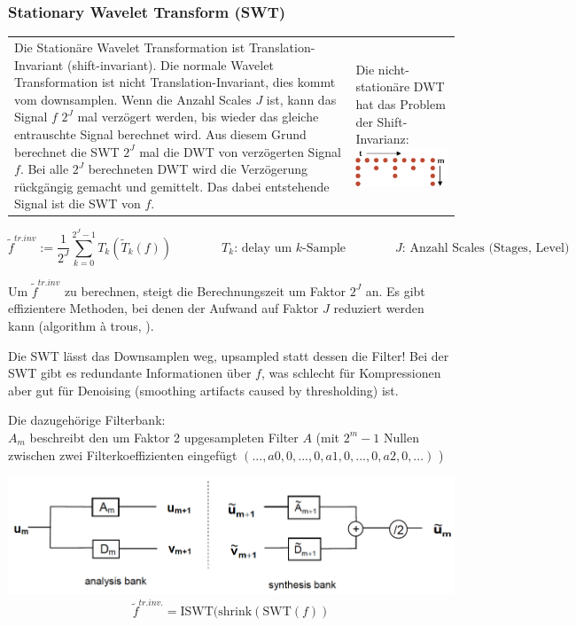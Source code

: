 \subsubsection{Stationary  Wavelet Transform (SWT) }
\begin{tabularx}{\textwidth}{X p{5cm}}

  Die Stationäre Wavelet Transformation ist Translation-Invariant (shift-invariant). Die normale Wavelet Transformation ist nicht Translation-Invariant, dies kommt vom downsamplen. Wenn die Anzahl Scales $J$ ist, kann das Signal $f$ $2^J$ mal verzögert werden, bis wieder das gleiche entrauschte Signal berechnet wird. Aus diesem Grund berechnet die SWT  $2^J$ mal die DWT von verzögerten Signal $f$. Bei alle $2^J$ berechneten DWT wird die Verzögerung rückgängig gemacht und gemittelt. Das dabei entstehende Signal ist die SWT von $f$. 
  & Die nicht-stationäre DWT hat das Problem der Shift-Invarianz:\newline
  \includegraphics[width=4.5cm]{./content/NonStationarity.png}
\end{tabularx}


\[ 
	\tilde{f}^{tr.inv} := \dfrac{1}{2^J} \sum_{k=0}^{2^J-1}T_k \left( \tilde{T}_k(f) \right) 
	\qquad \qquad
	T_k \text{: delay um $k$-Sample} \qquad \qquad J\text{: Anzahl Scales (Stages, Level)}
\]

Um $\tilde{f}^{tr.inv}$ zu berechnen, steigt die Berechnungszeit um Faktor $2^J$ an. Es gibt effizientere Methoden, bei denen der Aufwand auf Faktor $J$ reduziert werden kann (algorithm à trous, ).

Die SWT lässt das Downsamplen weg, upsampled statt dessen die Filter! Bei der SWT gibt es redundante Informationen über $f$, was schlecht für Kompressionen aber gut für Denoising (smoothing artifacts caused by thresholding) ist.

\begin{minipage}[l]{0.5\textwidth}
	Die dazugehörige Filterbank: \\
	$A_m$ beschreibt den um Faktor 2 upgesampleten Filter $A$ (mit $2^m -1$ Nullen zwischen zwei Filterkoeffizienten eingefügt $(...,a0,0,...,0,a1,0,...,0,a2,0,...)$ )
\end{minipage}
\begin{minipage}[r]{0.5\textwidth}
	\flushright
	\includegraphics[width=.9\textwidth]{content/swtFilterbank.pdf}
	\[ \tilde{f}^{tr.inv.}=\mathrm{ISWT}(\mathrm{shrink}(\mathrm{SWT}(f)) \]
\end{minipage}


